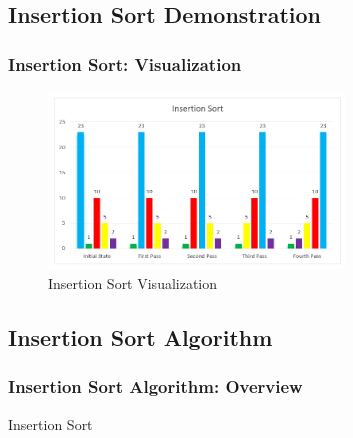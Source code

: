 \documentclass{beamer}
\begin{document}
\subsection{Insertion Sort Demonstration}
\begin{frame}[c, fragile]
  \frametitle{Insertion Sort: Visualization}

  \begin{figure}
    \centering
    \includegraphics[width=0.7\textwidth]{chart2.png}
    \caption{Insertion Sort Visualization}
    \label{fig:insertion-visualization}
  \end{figure}

\end{frame}

\subsection{Insertion Sort Algorithm}
\begin{frame}[fragile]
  \frametitle{Insertion Sort Algorithm: Overview}
\begin{mybox}
   \begin{algorithm}[H]
    \caption{Insertion Sort}
    \label{algo:insertionsort}

  \end{algorithm}  
\end{mybox}
 

\end{frame}
\end{document}
